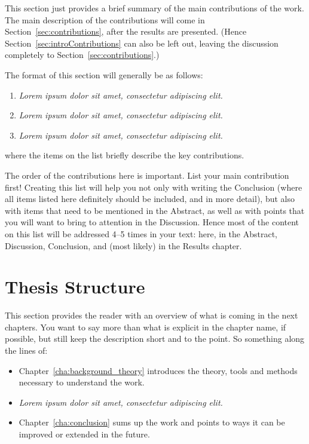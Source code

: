 This section just provides a brief summary of the main contributions of the work. 
The main description of the contributions will come in Section~\ref{sec:contributions}, after the results are presented. 
(Hence Section~\ref{sec:introContributions} can also be left out, leaving the discussion completely to Section~\ref{sec:contributions}.)

The format of this section will generally be as follows:

\begin{enumerate}
\item \textit{Lorem ipsum dolor sit amet, consectetur adipiscing elit.}
\item \textit{Lorem ipsum dolor sit amet, consectetur adipiscing elit.}
\item \textit{Lorem ipsum dolor sit amet, consectetur adipiscing elit.}
\end{enumerate}

\noindent
where the items on the list briefly describe the key contributions.

The order of the contributions here is important. List your main contribution first!
Creating this list will help you not only with writing the Conclusion (where all items listed here definitely should be included, and in more detail), 
but also with items that need to be mentioned in the Abstract, as well as with points that you will want to bring to attention in the Discussion.
Hence most of the content on this list will be addressed 4--5 times in your text: here, in the Abstract, Discussion, Conclusion, and (most likely)
in the Results chapter. 

\section{Thesis Structure}
\label{sec:thesisStructure}

This section provides the reader with an overview of what is coming in the next chapters. 
You want to say more than what is explicit in the chapter name, if possible, but still keep the description short and to the point. So something along the lines of:

\begin{itemize}
\item Chapter~\ref{cha:background_theory} introduces the theory, tools and methods necessary to understand the work.
\item \textit{Lorem ipsum dolor sit amet, consectetur adipiscing elit.}
\item Chapter~\ref{cha:conclusion} sums up the work and points to ways it can be improved or extended in the future.
\end{itemize}

\glsresetall
